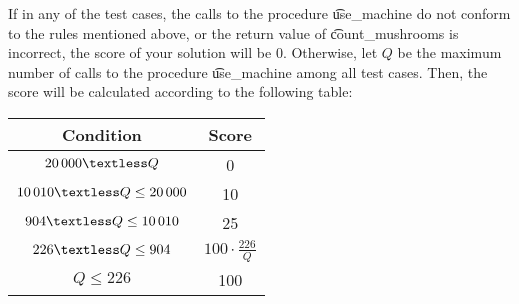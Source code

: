 If in any of the test cases, the calls to the procedure \t{use\_machine} do not conform to the rules mentioned above, or the return value of \t{count\_mushrooms} is incorrect, the score of your solution will be $0$. Otherwise, let $Q$ be the maximum number of calls to the procedure \t{use\_machine} among all test cases. Then, the score will be calculated according to the following table:
\newcommand{\lt}{\textless} 


\begin{center}
\renewcommand{\arraystretch}{1.5}
\begin{tabular}{|c|c|}
\hline
Condition & Score  \\
\hline
$20\,000 \lt Q$ & 0 \\
\hline

$10\,010 \lt Q \le 20\,000$ & 10 \\
\hline

$904 \lt Q \le 10\,010$ & 25 \\
\hline

$226 \lt Q \le 904$ & $100 \cdot \frac{226}{Q}$ \\
\hline

$Q \le 226$ & 100 \\
\hline

\end{tabular}
\end{center}
